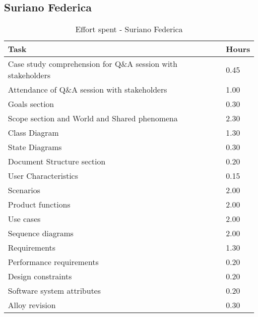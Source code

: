 \subsection{Suriano Federica}
\renewcommand{\arraystretch}{2}
\begin{longtable}{|m{9cm}|m{1.2cm}|}
\caption{Effort spent - Suriano Federica}\\
\hline
\endfirsthead
\endhead
\hline
\endlastfoot
\rowcolor{green2}
\textbf{Task} &\hfil {\textbf{Hours}}\\
\hline
Case study comprehension for Q\&A session with stakeholders & \hfil 0.45\\
Attendance of Q\&A session with stakeholders & \hfil 1.00\\
Goals section & \hfil 0.30\\
Scope section and World and Shared phenomena & \hfil 2.30\\
Class Diagram & \hfil 1.30\\
State Diagrams & \hfil 0.30\\
Document Structure section & \hfil 0.20\\
User Characteristics & \hfil 0.15\\
Scenarios  & \hfil 2.00\\
Product functions & \hfil 2.00\\
Use cases & \hfil 2.00\\
Sequence diagrams & \hfil 2.00\\
Requirements & \hfil 1.30\\
Performance requirements & \hfil 0.20\\
Design constraints& \hfil 0.20\\
Software system attributes & \hfil 0.20\\
Alloy revision & \hfil 0.30\\
\hline
\end{longtable}
